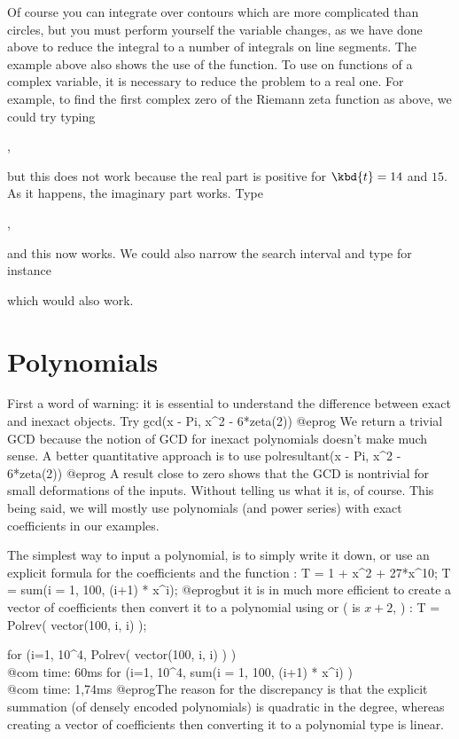 Of course you can integrate over contours which are more complicated than
circles, but you must perform yourself the variable changes, as we have done
above to reduce the integral to a number of integrals on line segments.
\smallskip
%
The example above also shows the use of the  function. To use
 on functions of a complex variable, it is necessary to reduce the
problem to a real one. For example, to find the first complex zero of the
Riemann zeta function as above, we could try typing

,

\noindent but this does not work because the real part is positive for
$\kbd{t}=14$ and $15$. As it happens, the imaginary part works. Type

,

\noindent and this now works. We could also narrow the search interval and
type for instance


\noindent which would also work.

\section{Polynomials}

First a word of warning: it is essential to understand the difference between
exact and inexact objects. Try
\bprog
  gcd(x - Pi, x^2 - 6*zeta(2))
@eprog\noindent
We return a trivial GCD because the notion of GCD for inexact polynomials
doesn't make much sense. A better quantitative approach is to use
\bprog
  polresultant(x - Pi, x^2 - 6*zeta(2))
@eprog\noindent
A result close to zero shows that the GCD is nontrivial for small
deformations of the inputs. Without telling us what it is, of course. This
being said, we will mostly use polynomials (and power series) with exact
coefficients in our examples.\smallskip

The simplest way to input a polynomial, is to simply write it down,
or use an explicit formula for the coefficients and the function :
\bprog
  T = 1 + x^2 + 27*x^10;
  T = sum(i = 1, 100, (i+1) * x^i);
@eprog\noindent but it is in much more efficient to create a vector of
coefficients then convert it to a polynomial using  or 
( is $x+2$, ) :
\bprog
  T = Polrev( vector(100, i, i) );

  for (i=1, 10^4, Polrev( vector(100, i, i) ) )   \\@com time: 60ms
  for (i=1, 10^4, sum(i = 1, 100, (i+1) * x^i) ) \\@com time: 1,74ms
@eprog\noindent The reason for the discrepancy is that the explicit summation
(of densely encoded polynomials) is quadratic in the degree, whereas creating
a vector of coefficients then converting it to a polynomial type is linear.

